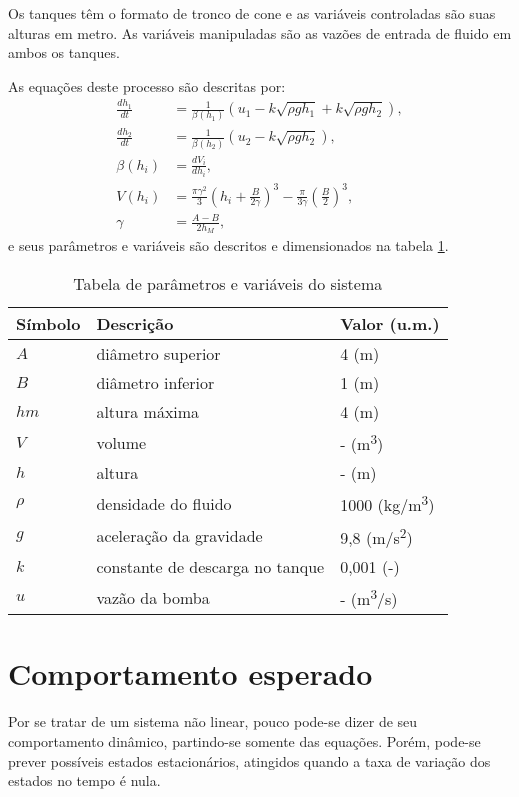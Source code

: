 Os tanques têm o formato de tronco de cone e as variáveis controladas são suas alturas em metro. As variáveis manipuladas são as vazões de entrada de fluido em ambos os tanques.

As equações deste processo são descritas por:
\begin{align}
\frac{dh_1}{dt} &= \frac{1}{\beta(h_1)}(u_1 - k\sqrt{\rho g h_1} + k\sqrt{\rho g h_2}), \\
\frac{dh_2}{dt} &= \frac{1}{\beta(h_2)}(u_2 - k\sqrt{\rho g h_2}), \\
\beta(h_i) &= \frac{dV_i}{dh_i}, \\
V(h_i) &= \frac{\pi\gamma^2}{3}(h_i + \frac{B}{2\gamma})^3 - \frac{\pi}{3\gamma}(\frac{B}{2})^3, \\
\gamma &= \frac{A-B}{2h_M},
\label{eq_descritivas}
\end{align}
e seus parâmetros e variáveis são descritos e dimensionados na tabela \ref{tbl_parameters}.

\begin{table}[htb]
	\centering
	\caption{Tabela de parâmetros e variáveis do sistema}
	\begin{tabular} {|m{5em} m{15em} m{8em}|}
		\hline
		Símbolo & Descrição & Valor (u.m.) \\
		\hline
		$A$ & diâmetro superior & 4 (m) \\
		$B$ & diâmetro inferior & 1 (m) \\
		$hm$ & altura máxima & 4 (m) \\
		$V$ & volume & - (m\textsuperscript{3}) \\
		$h$ & altura & - (m) \\
		$\rho$ & densidade do fluido & 1000 (kg/m\textsuperscript{3}) \\
		$g$ & aceleração da gravidade & 9,8 (m/s\textsuperscript{2}) \\
		$k$ & constante de descarga no tanque & 0,001 (-)\\
		$u$ & vazão da bomba & - (m\textsuperscript{3}/s)\\
		\hline
	\end{tabular}
	\label{tbl_parameters}
\end{table}

\section{Comportamento esperado} \label{comportamento_esperado}

Por se tratar de um sistema não linear, pouco pode-se dizer de seu comportamento dinâmico, partindo-se somente das equações. Porém, pode-se prever possíveis estados estacionários, atingidos quando a taxa de variação dos estados no tempo é nula.

